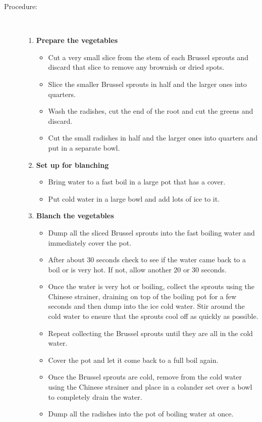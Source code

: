 \documentclass[11pt,letterpaper]{article}
\begin{document}
\begin{description}
\item[Procedure:]\ \\
	\begin{enumerate}
	\item {\bf Prepare the vegetables}
	\begin{itemize}
	\item Cut a very small slice from the stem of each Brussel sprouts and discard that slice to remove any brownish or dried spots.
	\item Slice the smaller Brussel sprouts in half and the larger ones into quarters.
	\item Wash the radishes, cut the end of the root and cut the greens and discard.
	\item Cut the small radishes in half and the larger ones into quarters and put in a separate bowl.
	\end{itemize}
	\item {\bf Set up for blanching}
	\begin{itemize}
	\item Bring water to a fast boil in a large pot that has a cover.
	\item Put cold water in a large bowl and add lots of ice to it.
	\end{itemize}
	\item {\bf Blanch the vegetables}
	\begin{itemize}
	\item Dump all the sliced Brussel sprouts into the fast boiling water and immediately cover the pot.
	\item After about 30 seconds check to see if the water came back to a boil or is very hot. If not, allow another 20 or 30 seconds.
	\item Once the water is very hot or boiling, collect the sprouts using the Chinese strainer, draining on top of the boiling pot for a few seconds and then dump into the ice cold water. Stir around the cold water to ensure that the sprouts cool off as quickly as possible.
	\item Repeat collecting the Brussel sprouts until they are all in the cold water.
	\item Cover the pot and let it come back to a full boil again.
	\item Once the Brussel sprouts are cold, remove from the cold water using the Chinese strainer and place in a colander set over a bowl to completely drain the water.
	\item Dump all the radishes into the pot of boiling water at once. 

\end{itemize}
\end{enumerate}
\end{description}
\end{document}
